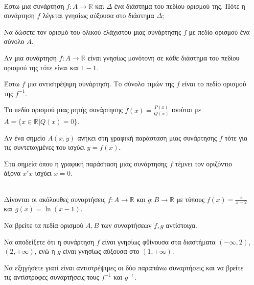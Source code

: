 \documentclass[twoside,nofonts,internet,math,spyros]{frontisthrio-diag}
\begin{document}
\begin{thema}
\item \mbox{}\\\vspace{-5mm}
\begin{erwthma}
\item Έστω μια συνάρτηση $ f:A\to\mathbb{R} $ και $ \varDelta $ ένα διάστημα του πεδίου ορισμού της. Πότε η συνάρτηση $ f $ λέγεται γνησίως αύξουσα στο διάστημα $ \varDelta $;
\item Να δώσετε τον ορισμό του ολικού ελάχιστου μιας συνάρτησης $ f $ με πεδίο ορισμού ένα σύνολο $ A $.\\
\item \swstolathospan
\begin{alist}
\item Αν μια συνάρτηση $ f:A\to\mathbb{R} $ είναι γνησίως μονότονη σε κάθε διάστημα του πεδίου ορισμού της τότε είναι και $ 1-1 $.
\item Έστω $ f $ μια αντιστρέψιμη συνάρτηση. Το σύνολο τιμών της $ f $ είναι το πεδίο ορισμού της $ f^{-1} $.
\item Το πεδίο ορισμού μιας ρητής συνάρτησης $ f(x)=\frac{P(x)}{Q(x)} $ ισούται με $ A=\{x\in\mathbb{R}|Q(x)=0\} $.
\item Αν ένα σημείο $ A(x,y) $ ανήκει στη γραφική παράσταση μιας συνάρτησης $ f $ τότε για τις συντεταγμένες του ισχύει $ y=f(x) $.
\item Στα σημεία όπου η γραφική παράσταση μιας συνάρτησης $ f $ τέμνει τον οριζόντιο άξονα $ x'x $ ισχύει $ x=0 $.
\end{alist}
\end{erwthma}
\item \mbox{}\\
Δίνονται οι ακόλουθες συναρτήσεις $ f:A\to\mathbb{R} $ και $ g:B\to\mathbb{R} $ με τύπους $ f(x)=\frac{x}{x-2} $ και $ g(x)=\ln{(x-1)} $.
\begin{erwthma}
\item Να βρείτε τα πεδία ορισμού $ A,B $ των συναρτήσεων $ f,g $ αντίστοιχα.
\item Να αποδείξετε ότι η συνάρτηση $ f $ είναι γνησίως φθίνουσα στα διαστήματα $ (-\infty,2) $, $ (2,+\infty) $, ενώ η $ g $ είναι γνησίως αύξουσα στο $ (1,+\infty) $.
\item Να εξηγήσετε γιατί είναι αντιστρέψιμες οι δύο παραπάνω συναρτήσεις και να βρείτε τις αντίστροφες συναρτήσεις τους $ f^{-1} $ και $ g^{-1} $.\\
\end{erwthma}
\item 
\item 
\end{thema}
\end{document}
